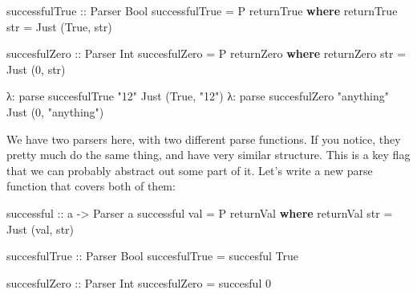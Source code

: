 \documentclass[]{article}
\newenvironment{Shaded}{}{}
\newcommand{\KeywordTok}[1]{\textcolor[rgb]{0.00,0.44,0.13}{\textbf{{#1}}}}
\newcommand{\DataTypeTok}[1]{\textcolor[rgb]{0.56,0.13,0.00}{{#1}}}
\newcommand{\DecValTok}[1]{\textcolor[rgb]{0.25,0.63,0.44}{{#1}}}
\newcommand{\StringTok}[1]{\textcolor[rgb]{0.25,0.44,0.63}{{#1}}}
\newcommand{\OtherTok}[1]{\textcolor[rgb]{0.00,0.44,0.13}{{#1}}}
\newcommand{\FunctionTok}[1]{\textcolor[rgb]{0.02,0.16,0.49}{{#1}}}
\newcommand{\NormalTok}[1]{{#1}}
\begin{document}
\begin{Shaded}
\begin{Highlighting}[]
\OtherTok{successfulTrue ::} \DataTypeTok{Parser} \DataTypeTok{Bool}
\NormalTok{successfulTrue }\FunctionTok{=} \DataTypeTok{P} \NormalTok{returnTrue}
    \KeywordTok{where}
        \NormalTok{returnTrue str }\FunctionTok{=} \DataTypeTok{Just} \NormalTok{(}\DataTypeTok{True}\NormalTok{, str)}

\OtherTok{succesfulZero ::} \DataTypeTok{Parser} \DataTypeTok{Int}
\NormalTok{succesfulZero }\FunctionTok{=} \DataTypeTok{P} \NormalTok{returnZero}
    \KeywordTok{where}
        \NormalTok{returnZero str }\FunctionTok{=} \DataTypeTok{Just} \NormalTok{(}\DecValTok{0}\NormalTok{, str)}
\end{Highlighting}
\end{Shaded}

\begin{Shaded}
\begin{Highlighting}[]
\NormalTok{λ}\FunctionTok{:} \NormalTok{parse succesfulTrue }\StringTok{"12"}
\DataTypeTok{Just} \NormalTok{(}\DataTypeTok{True}\NormalTok{, }\StringTok{"12"}\NormalTok{)}
\NormalTok{λ}\FunctionTok{:} \NormalTok{parse succesfulZero }\StringTok{"anything"}
\DataTypeTok{Just} \NormalTok{(}\DecValTok{0}\NormalTok{, }\StringTok{"anything"}\NormalTok{)}
\end{Highlighting}
\end{Shaded}

We have two parsers here, with two different parse functions. If you
notice, they pretty much do the same thing, and have very similar
structure. This is a key flag that we can probably abstract out some
part of it. Let's write a new parse function that covers both of them:

\begin{Shaded}
\begin{Highlighting}[]
\OtherTok{successful ::} \NormalTok{a }\OtherTok{->} \DataTypeTok{Parser} \NormalTok{a}
\NormalTok{successful val }\FunctionTok{=} \DataTypeTok{P} \NormalTok{returnVal}
    \KeywordTok{where}
        \NormalTok{returnVal str }\FunctionTok{=} \DataTypeTok{Just} \NormalTok{(val, str)}

\OtherTok{succesfulTrue ::} \DataTypeTok{Parser} \DataTypeTok{Bool}
\NormalTok{succesfulTrue }\FunctionTok{=} \NormalTok{succesful }\DataTypeTok{True}

\OtherTok{succesfulZero ::} \DataTypeTok{Parser} \DataTypeTok{Int}
\NormalTok{succesfulZero }\FunctionTok{=} \NormalTok{succesful }\DecValTok{0}
\end{Highlighting}
\end{Shaded}
\end{document}

